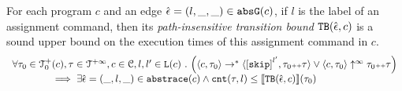   \begin{theorem}
  For each program ${c}$ and an edge $\hat{\mathtt{\epsilon}{}} = (l, \_, \_) \in \mathtt{abs}{\mathtt{G}}(c)$, if $l$ is the label of an assignment command,
  then its \emph{path-insensitive transition bound} ${\mathtt{TB}}(\hat{\mathtt{\epsilon}{}}, c)$ 
   is a sound upper bound on 
  the execution times of this assignment command in $c$.
    \[
      \begin{array}{l}
        \forall \trace_0 \in \ftdom_0(c), \trace \in \tdom, c \in \cdom, l, l' \in \lvar(c) \st
        \Big( \config{c, \trace_0} \rightarrow^{*} \config{\clabel{\eskip}^{l'}, \trace_0 \tracecat \trace} 
          \lor  \config{c, \trace_0} \uparrow^{\infty} \trace_0 \tracecat \trace \Big)
         \\ \qquad \qquad
         \implies
         \exists \absevent = (\_, l, \_) \in \absflow(c) \land
        \counter(\trace, l) \leq \econfig{\absclr(\absevent, c)}(\trace_0)
      \end{array}
    \]
  \end{theorem}
%
